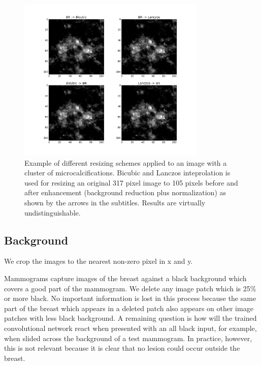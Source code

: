 \begin{figure}
	\centering
	\includegraphics [width = 0.8\textwidth]{plots/mcDiffResizings.png}
	\caption[Example of resizing schemes]{Example of different resizing schemes applied to an image with a cluster of microcalcifications. Bicubic and Lanczos inteprolation is used for resizing an original 317 pixel image to 105 pixels before and after enhancement (background reduction plus normalization) as shown by the arrows in the subtitles. Results are virtually undistinguishable.}
	\label{fig:ResizingInterps}
\end{figure}

\subsection{Background}
We crop the images to the nearest non-zero pixel in x and y.




Mammograms capture images of the breast against a black background which covers a good part of the mammogram. We delete any image patch which is 25\% or more black. No important information is lost in this process because the same part of the breast which appears in a deleted patch also appears on other image patches with less black background. A remaining question is how will the trained convolutional network react when presented with an all black input, for example, when slided across the background of a test mammogram. In practice, however, this is not relevant because it is clear that no lesion could occur outside the breast. 


